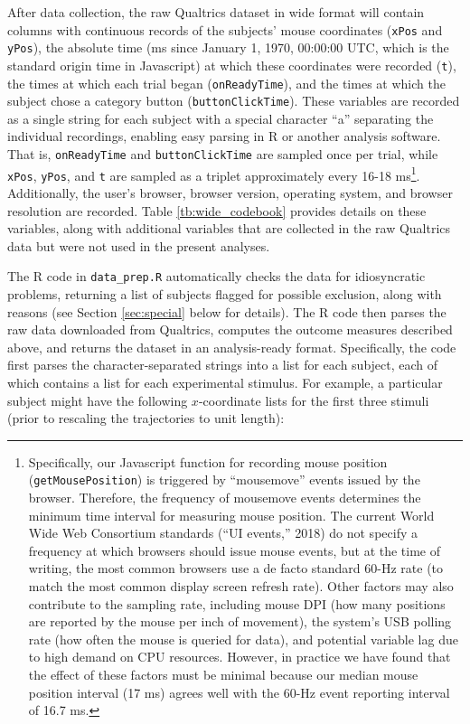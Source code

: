 \documentclass[]{article}
\let\rmarkdownfootnote\footnote%
\def\footnote{\protect\rmarkdownfootnote}
\begin{document}
After data collection, the raw Qualtrics dataset in wide format will
contain columns with continuous records of the subjects' mouse
coordinates (\texttt{xPos} and \texttt{yPos}), the absolute time (ms
since January 1, 1970, 00:00:00 UTC, which is the standard origin time
in Javascript) at which these coordinates were recorded (\texttt{t}),
the times at which each trial began (\texttt{onReadyTime}), and the
times at which the subject chose a category button
(\texttt{buttonClickTime}). These variables are recorded as a single
string for each subject with a special character ``a'' separating the
individual recordings, enabling easy parsing in R or another analysis
software. That is, \texttt{onReadyTime} and \texttt{buttonClickTime} are
sampled once per trial, while \texttt{xPos}, \texttt{yPos}, and
\texttt{t} are sampled as a triplet approximately every 16-18
ms\footnote{Specifically, our Javascript function for recording mouse
  position (\texttt{getMousePosition}) is triggered by ``mousemove''
  events issued by the browser. Therefore, the frequency of mousemove
  events determines the minimum time interval for measuring mouse
  position. The current World Wide Web Consortium standards (``UI
  events,'' 2018) do not specify a frequency at which browsers should
  issue mouse events, but at the time of writing, the most common
  browsers use a de facto standard 60-Hz rate (to match the most common
  display screen refresh rate). Other factors may also contribute to the
  sampling rate, including mouse DPI (how many positions are reported by
  the mouse per inch of movement), the system's USB polling rate (how
  often the mouse is queried for data), and potential variable lag due
  to high demand on CPU resources. However, in practice we have found
  that the effect of these factors must be minimal because our median
  mouse position interval (17 ms) agrees well with the 60-Hz event
  reporting interval of 16.7 ms.}. Additionally, the user's browser,
browser version, operating system, and browser resolution are recorded.
Table \ref{tb:wide_codebook} provides details on these variables, along
with additional variables that are collected in the raw Qualtrics data
but were not used in the present analyses.

The R code in \texttt{data\_prep.R} automatically checks the data for
idiosyncratic problems, returning a list of subjects flagged for
possible exclusion, along with reasons (see Section \ref{sec:special}
below for details). The R code then parses the raw data downloaded from
Qualtrics, computes the outcome measures described above, and returns
the dataset in an analysis-ready format. Specifically, the code first
parses the character-separated strings into a list for each subject,
each of which contains a list for each experimental stimulus. For
example, a particular subject might have the following \(x\)-coordinate
lists for the first three stimuli (prior to rescaling the trajectories
to unit length):
\end{document}

